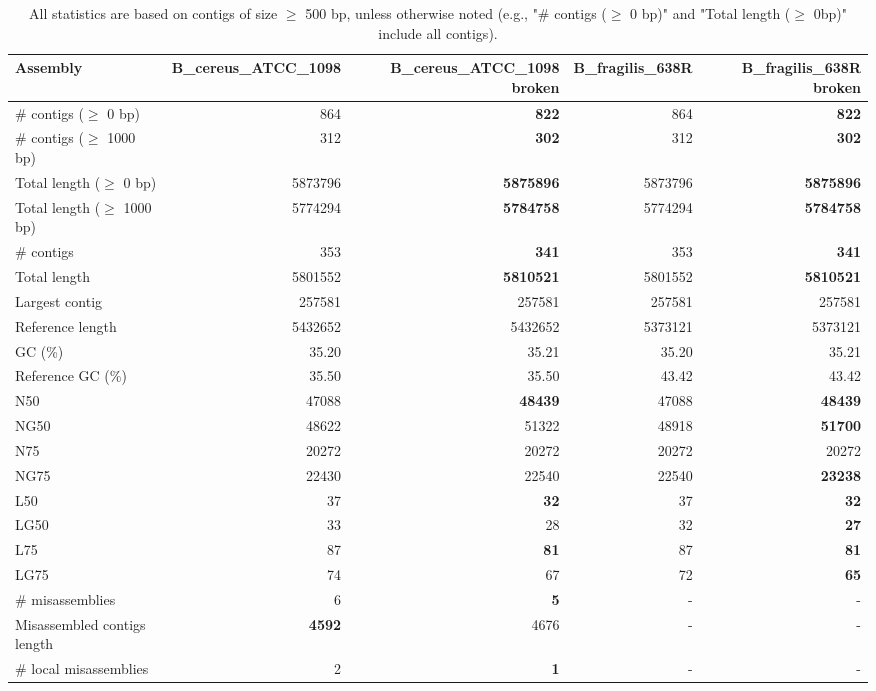 \documentclass[12pt,a4paper]{article}
\begin{document}
\begin{table}[ht]
\begin{center}
\caption{All statistics are based on contigs of size $\geq$ 500 bp, unless otherwise noted (e.g., "\# contigs ($\geq$ 0 bp)" and "Total length ($\geq$ 0bp)" include all contigs).}
\begin{tabular}{|l*{4}{|r}|}
\hline
Assembly & B\_cereus\_ATCC\_1098 & B\_cereus\_ATCC\_1098 broken & B\_fragilis\_638R & B\_fragilis\_638R broken \\ \hline
\# contigs ($\geq$ 0 bp) & 864 & {\bf 822} & 864 & {\bf 822} \\ \hline
\# contigs ($\geq$ 1000 bp) & 312 & {\bf 302} & 312 & {\bf 302} \\ \hline
Total length ($\geq$ 0 bp) & 5873796 & {\bf 5875896} & 5873796 & {\bf 5875896} \\ \hline
Total length ($\geq$ 1000 bp) & 5774294 & {\bf 5784758} & 5774294 & {\bf 5784758} \\ \hline
\# contigs & 353 & {\bf 341} & 353 & {\bf 341} \\ \hline
Total length & 5801552 & {\bf 5810521} & 5801552 & {\bf 5810521} \\ \hline
Largest contig & 257581 & 257581 & 257581 & 257581 \\ \hline
Reference length & 5432652 & 5432652 & 5373121 & 5373121 \\ \hline
GC (\%) & 35.20 & 35.21 & 35.20 & 35.21 \\ \hline
Reference GC (\%) & 35.50 & 35.50 & 43.42 & 43.42 \\ \hline
N50 & 47088 & {\bf 48439} & 47088 & {\bf 48439} \\ \hline
NG50 & 48622 & 51322 & 48918 & {\bf 51700} \\ \hline
N75 & 20272 & 20272 & 20272 & 20272 \\ \hline
NG75 & 22430 & 22540 & 22540 & {\bf 23238} \\ \hline
L50 & 37 & {\bf 32} & 37 & {\bf 32} \\ \hline
LG50 & 33 & 28 & 32 & {\bf 27} \\ \hline
L75 & 87 & {\bf 81} & 87 & {\bf 81} \\ \hline
LG75 & 74 & 67 & 72 & {\bf 65} \\ \hline
\# misassemblies & 6 & {\bf 5} & - & - \\ \hline
Misassembled contigs length & {\bf 4592} & 4676 & - & - \\ \hline
\# local misassemblies & 2 & {\bf 1} & - & - \\ \hline

\end{tabular}
\end{center}
\end{table}
\end{document}
